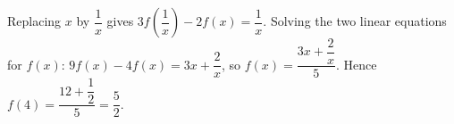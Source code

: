 Replacing $x$ by $\dfrac1x$ gives $3f\!\left(\dfrac1x\right)-2f(x)=\dfrac1x$. Solving the two linear equations for $f(x)$: $9f(x)-4f(x)=3x+\dfrac2x$, so $f(x)=\dfrac{3x+\dfrac2x}5$. Hence $f(4)=\dfrac{12+\dfrac12}5=\boxed{\dfrac52}$.
